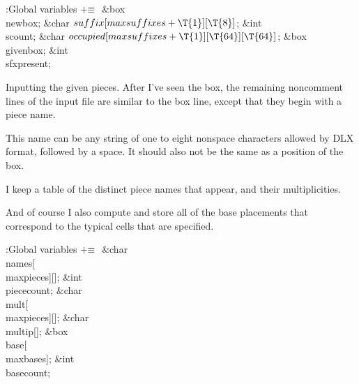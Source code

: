 \B{}:Global variables\X${}\mathrel+\equiv{}$\6
\&{box} \\{newbox};\6
\&{char} ${}\\{suffix}[\\{maxsuffixes}+\T{1}][\T{8}]{}$;\6
\&{int} \\{scount};\6
\&{char} ${}\\{occupied}[\\{maxsuffixes}+\T{1}][\T{64}][\T{64}]{}$;\6
\&{box} \\{givenbox};\6
\&{int} \\{sfxpresent};%
\par
\fi

Inputting the given pieces. After I've seen the box, the remaining
noncomment lines of the input file are similar to the box line, except
that they begin with a piece name.

This name can be any string of one to eight nonspace characters
allowed by {\mc DLX} format, followed by a space. It should also
not be the same as a position of the box.

I keep a table of the distinct piece names that appear, and their
multiplicities.

And of course I also compute and store all of the base placements that
correspond to the typical cells that are specified.

\Y\B\4:Global variables\X${}\mathrel+\equiv{}$\6
\&{char} \\{names}[\\{maxpieces}][];\6
\&{int} \\{piececount};\6
\&{char} \\{mult}[\\{maxpieces}][];\6
\&{char} \\{multip}[];\6
\&{box} \\{base}[\\{maxbases}];\6
\&{int} \\{basecount};\par
\fi

